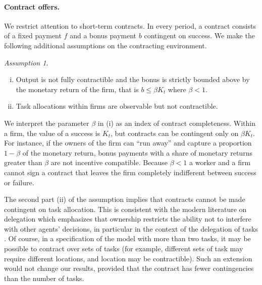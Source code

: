 \documentclass[12pt,american]{paper}
\theoremstyle{remark}
\newtheorem{ass}{Assumption}
\begin{document}
%

\paragraph{Contract offers.} 
We restrict attention to short-term contracts. In every period, a contract consists of a fixed payment $f$ and a bonus payment $b$ contingent on success. We make the following additional assumptions on the contracting environment.

\begin{ass}
\hspace{1cm}
\begin{enumerate}[(i)]
\item Output is not fully contractible and the bonus is strictly bounded above by the monetary return of the firm, that is $b\leq \beta K_t$ where $\beta<1$.
\item Task allocations within firms are observable but not contractible.
\end{enumerate} 
\end{ass}
%
We interpret the parameter $\beta$ in (i) as an index of contract completeness. Within a firm, the value of a success is $K_t$, but contracts can be contingent only on $\beta K_t$. For instance, if the owners of the firm can ``run away''  and capture a proportion $1-\beta$ of the monetary return, bonus payments with a share of monetary returns greater than $\beta$ are not incentive compatible.  Because $\beta < 1$ a worker and a firm cannot sign a contract that leaves the firm completely indifferent between success or failure.

The second part (ii) of the assumption implies that contracts cannot be made contingent on task allocation. This is consistent with the modern literature on delegation which emphasizes that  ownership  restricts the ability not to interfere with other agents' decisions, in particular in the context of the delegation of tasks \citep{aghion1997a,Baker:1999fv}. %
Of course, in a specification of the model with more than two tasks, it may be possible to contract over sets of tasks (for example, different sets of task may require different locations, and location may be contractible). Such an extension would not change our results, provided that the contract has fewer contingencies than the number of tasks.
\end{document}
